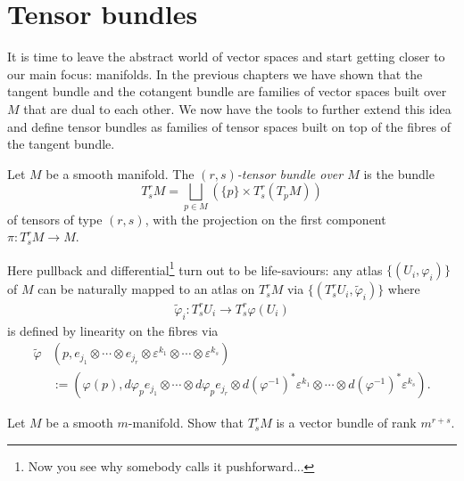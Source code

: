 \section{Tensor bundles}

It is time to leave the abstract world of vector spaces and start getting closer to our main focus: manifolds.
In the previous chapters we have shown that the tangent bundle and the cotangent bundle are families of vector spaces built over $M$ that are dual to each other.
We now have the tools to further extend this idea and define tensor bundles as families of tensor spaces built on top of the fibres of the tangent bundle.

\begin{definition}
	Let $M$ be a smooth manifold.
	The \emph{$(r,s)$-tensor bundle over $M$} is the bundle
	\begin{equation}
		T_s^r M = \bigsqcup_{p\in M}\left(\{p\}\times T_s^r(T_p M)\right)
	\end{equation}
	of tensors of type $(r,s)$, with the projection on the first component $\pi:T_s^r M\to M$.
\end{definition}

Here pullback and differential\footnote{Now you see why somebody calls it pushforward...} turn out to be life-saviours:
any atlas $\{(U_i, \varphi_i)\}$ of $M$ can be naturally mapped to an atlas  on $T_s^r M$ via $\{(T_s^r U_i, \widetilde\varphi_i)\}$ where
\begin{align}
	\widetilde\varphi_i : T_s^r U_i \to T_s^r\varphi(U_i)
\end{align}
is defined by linearity on the fibres via
\begin{align}
	\widetilde\varphi & (p, e_{j_1}\otimes\cdots\otimes e_{j_r}\otimes \varepsilon^{k_1}\otimes \cdots\otimes \varepsilon^{k_s})                                                                     \\
	                  & :=(\varphi(p), d\varphi_p e_{j_1}\otimes\cdots\otimes d\varphi_p e_{j_r}\otimes d(\varphi^{-1})^*\varepsilon^{k_1}\otimes \cdots\otimes d(\varphi^{-1})^*\varepsilon^{k_s}).
\end{align}

\begin{exercise}
	Let $M$ be a smooth $m$-manifold.
	Show that $T^r_sM$ is a vector bundle of rank $m^{r+s}$.
\end{exercise}

